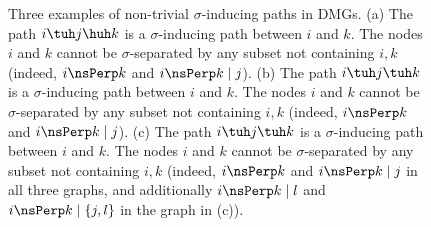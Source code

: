 \begin{figure}\centering
  \caption{Three examples of non-trivial $\sigma$-inducing paths in DMGs. (a) The path $i \tuh j \huh k$ is a $\sigma$-inducing path between $i$ and $k$. The nodes $i$ and $k$ cannot be $\sigma$-separated by any subset not containing $i,k$ (indeed, $i \nsPerp k$ and $i \nsPerp k \mid j$). (b) The path $i \tuh j \tuh k$ is a $\sigma$-inducing path between $i$ and $k$. The nodes $i$ and $k$ cannot be $\sigma$-separated by any subset not containing $i,k$ (indeed, $i \nsPerp k$ and $i \nsPerp k \mid j$). (c) The path $i \tuh j \tuh k$ is a $\sigma$-inducing path between $i$ and $k$. The nodes $i$ and $k$ cannot be $\sigma$-separated by any subset not containing $i,k$ (indeed, $i \nsPerp k$ and $i \nsPerp k \mid j$ in all three graphs, and additionally $i \nsPerp k \mid l$ and $i \nsPerp k \mid \{j,l\}$ in the graph in (c)).\label{fig:sigma-inducing_path}}
\end{figure}

